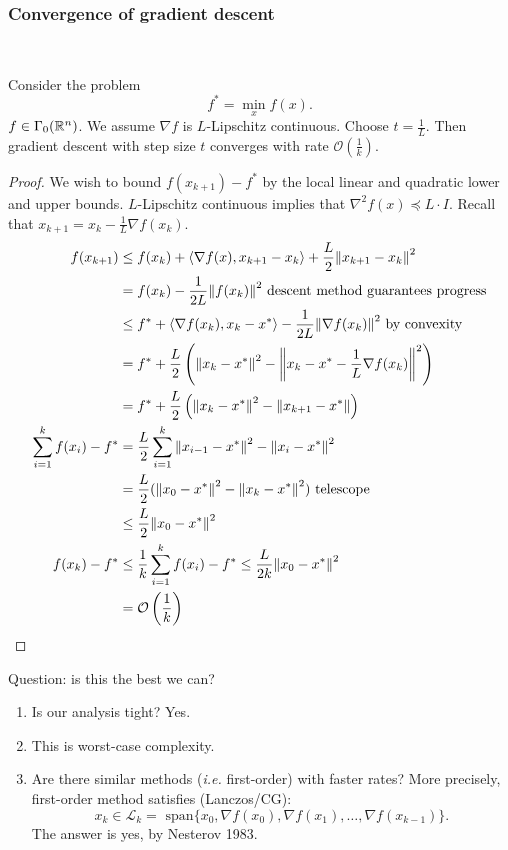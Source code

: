 \documentclass[class=article,crop=false]{standalone}
\begin{document}
\subsubsection{Convergence of gradient descent}

~\begin{thm}
	Consider the problem 
	\[
		f^* = \min_x f(x)
	.\] 
	$ f \in \Gamma_0(\mathbb{R}^{n})$. We assume $ \nabla f$ is $L$-Lipschitz continuous. Choose $ t = \frac{1}{L}$. Then gradient descent with step size $ t$ converges with rate  $ \mathcal{ O}\left( \frac{1}{k} \right) $.
\end{thm}
\begin{proof}
	We wish to bound $ f(x_{k+1}) - f^* $ by the local linear and quadratic lower and upper bounds. $L$-Lipschitz continuous implies that $ \nabla ^2 f(x) \preceq L \cdot I$. Recall that $ x_{k+1} = x_k - \frac{1}{L} \nabla f(x_k)$.
	\begin{align*}
		f(x_{k+1}) &\leq f(x_k) + \langle \nabla f(x), x_{k+1}-x_k \rangle + \frac{L}{2} {\left\lVert{ x_{k+1}-x_k}\right\rVert}^2 \\
			   &= f(x_k) - \frac{1}{2L} {\left\lVert{ f(x_k)}\right\rVert}^2 \text{ descent method guarantees progress} \\
			   &\leq f^* +\langle \nabla f(x_k),x_k-x^*  \rangle -\frac{1}{2L} {\left\lVert{ \nabla f(x_k)}\right\rVert}^2   \text{ by convexity} \\
			   &= f^* + \frac{L}{2} \left( {\left\lVert{ x_k-x^* }\right\rVert} ^2 - {\left\lVert{ x_k -x^* -\frac{1}{L} \nabla f(x_k)}\right\rVert}^2  \right)   \\
			   &= f^* + \frac{L}{2} \left( {\left\lVert{ x_k-x^* }\right\rVert}^2 - {\left\lVert{ x_{k+1} - x^* }\right\rVert}   \right)  \\
		\sum_{ i= 1}^{ k}  f(x_i) - f^* &= \frac{L}{2} \sum_{ i= 1}^{ k} {\left\lVert{ x_{i-1} - x^* }\right\rVert} ^2 - {\left\lVert{ x_i - x^* }\right\rVert}^2  \\
						&= \frac{L}{2} ({\left\lVert{ x_0 - x^* }\right\rVert}^2 - {\left\lVert{ x_k - x^* }\right\rVert}^2  ) \text{ telescope} \\
						&\leq \frac{L}{2} {\left\lVert{ x_0 - x^* }\right\rVert}^2   \\
		f(x_{k}) - f^* &\leq \frac{1}{k} \sum_{ i= 1}^{ k} f(x_i) - f^* \leq \frac{L}{2k} {\left\lVert{ x_0-x^* }\right\rVert}^2  \\
			       &= \mathcal{ O}\left( \frac{1}{k} \right) 
	\end{align*}
\end{proof}

Question: is this the best we can?
\begin{enumerate}[label=(\arabic*)]
	\item Is our analysis tight? Yes.
	\item This is worst-case complexity.
	\item Are there similar methods (\emph{i.e.} first-order) with faster rates? More precisely, first-order method satisfies (Lanczos/CG):
		\[
			x_k \in \mathscr{L}_k = \text{ span} \{x_0, \nabla f(x_0), \nabla f(x_1), \ldots , \nabla f(x_{k-1})\} 
		.\]
		The answer is yes, by Nesterov 1983.
\end{enumerate}
\end{document}
